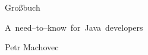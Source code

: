 \begin{titlepage}
    \vspace*{\fill}
    \begin{center}
        {\swabfamily\fontsize{90}{90}\selectfont Gro{\ss}buch\par}
        \vspace{1cm}
        \mbox{{\fontsize{20}{20}\selectfont A need--to--know for Java developers}}
        \vspace{3cm}
    \end{center}
    \vspace*{\fill}
    \begin{center}
        Petr Machovec
    \end{center}
\end{titlepage}
